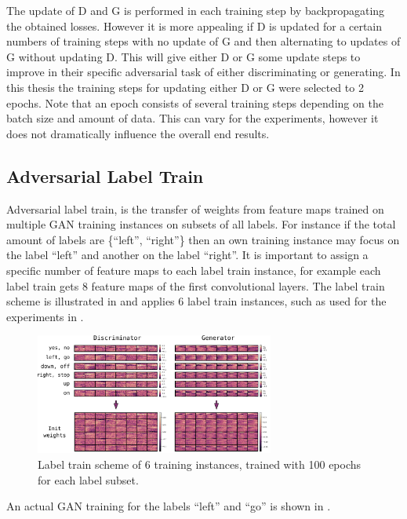 The update of D and G is performed in each training step by backpropagating the obtained losses.
However it is more appealing if D is updated for a certain numbers of training steps with no update of G and then alternating to updates of G without updating D.
This will give either D or G some update steps to improve in their specific adversarial task of either discriminating or generating.
In this thesis the training steps for updating either D or G were selected to 2 epochs.
Note that an epoch consists of several training steps depending on the batch size and amount of data.
This can vary for the experiments, however it does not dramatically influence the overall end results.



\subsection{Adversarial Label Train}
Adversarial label train, is the transfer of weights from feature maps trained on multiple GAN training instances on subsets of all labels.
For instance if the total amount of labels are \{\enquote{left}, \enquote{right}\} then an own training instance may focus on the label \enquote{left} and another on the label \enquote{right}.
It is important to assign a specific number of feature maps to each label train instance, for example each label train gets 8 feature maps of the first convolutional layers.
The label train scheme is illustrated in  and applies 6 label train instances, such as used for the experiments in .
\begin{figure}[!ht]
  \centering
    \includegraphics[width=0.7\textwidth]{./4_nn/figs/nn_adv_label_scheme.pdf}
  \caption{Label train scheme of 6 training instances, trained with 100 epochs for each label subset.}
  \label{fig:nn_adv_label_scheme}
\end{figure}
\FloatBarrier
\noindent
An actual GAN training for the labels \enquote{left} and \enquote{go} is shown in .
